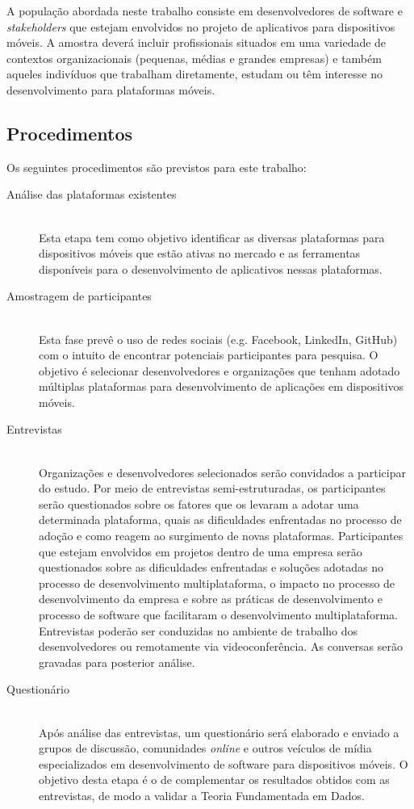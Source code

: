 \documentclass[conference]{IEEEtran}
\begin{document}
A população abordada neste trabalho consiste em desenvolvedores de software e \emph{stakeholders} que estejam envolvidos no projeto de aplicativos para dispositivos móveis. A amostra deverá incluir profissionais situados em uma variedade de contextos organizacionais (pequenas, médias e grandes empresas) e também aqueles indivíduos que trabalham diretamente, estudam ou têm interesse no desenvolvimento para plataformas móveis.

\subsection{Procedimentos}

Os seguintes procedimentos são previstos para este trabalho:

\begin{description}
	\item[Análise das plataformas existentes] \hfill \\ Esta etapa tem como objetivo identificar as diversas plataformas para dispositivos móveis que estão ativas no mercado e as ferramentas disponíveis para o desenvolvimento de aplicativos nessas plataformas. 
	
	\item[Amostragem de participantes] \hfill \\ Esta fase prevê o uso de redes sociais (e.g. Facebook, LinkedIn, GitHub) com o intuito de encontrar potenciais participantes para pesquisa. O objetivo é selecionar desenvolvedores e organizações que tenham adotado múltiplas plataformas para desenvolvimento de aplicações em dispositivos móveis.  

	\item[Entrevistas] \hfill \\ Organizações e desenvolvedores selecionados serão convidados a participar do estudo. Por meio de entrevistas semi-estruturadas, os participantes serão questionados sobre os fatores que os levaram a adotar uma determinada plataforma, quais as dificuldades enfrentadas no processo de adoção e como reagem ao surgimento de novas plataformas. Participantes que estejam envolvidos em projetos dentro de uma empresa serão questionados sobre as dificuldades enfrentadas e soluções adotadas no processo de desenvolvimento multiplataforma, o impacto no processo de desenvolvimento da empresa e sobre as práticas de desenvolvimento e processo de software que facilitaram o desenvolvimento multiplataforma. Entrevistas poderão ser conduzidas no ambiente de trabalho dos desenvolvedores ou remotamente via videoconferência. As conversas serão gravadas para posterior análise.

	\item[Questionário] \hfill \\ Após análise das entrevistas, um questionário será elaborado e enviado a grupos de discussão, comunidades \emph{online} e outros veículos de mídia especializados em desenvolvimento de software para dispositivos móveis. O objetivo desta etapa é o de complementar os resultados obtidos com as entrevistas, de modo a validar a Teoria Fundamentada em Dados.
\end{description}
\end{document}
